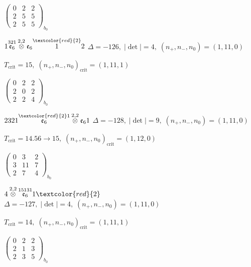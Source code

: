 \documentclass[10pt]{article}
\begin{document}
\hspace{2em}$\left(\begin{smallmatrix}0 & 2 & 2 \\ 2 & 5 & 5 \\ 2 & 5 & 5\end{smallmatrix}\right)_{\!b_0}$

$1\overset{321}{\mathfrak{e}_6}\overset{2,2}{\otimes}\mathfrak{e}_6\overset{\textcolor{red}{2}}{1}2$ \quad $\Delta=-126,\; |\det|=4,\; (n_+,n_-,n_0)=(1,11,0)$

\hspace{1em}$T_{\text{crit}}=15,\; (n_+,n_-,n_0)_{\text{crit}}=(1,11,1)$

\hspace{2em}$\left(\begin{smallmatrix}0 & 2 & 2 \\ 2 & 0 & 2 \\ 2 & 2 & 4\end{smallmatrix}\right)_{\!b_0}$

\smallskip

$2321\overset{\textcolor{red}{2}1}{\mathfrak{e}_6}\overset{2,2}{\otimes}\mathfrak{e}_61$ \quad $\Delta=-128,\; |\det|=9,\; (n_+,n_-,n_0)=(1,11,0)$

\hspace{1em}$T_{\text{crit}}=14.56 \to 15,\; (n_+,n_-,n_0)_{\text{crit}}=(1,12,0)$

\hspace{2em}$\left(\begin{smallmatrix}0 & 3 & 2 \\ 3 & 11 & 7 \\ 2 & 7 & 4\end{smallmatrix}\right)_{\!b_0}$

\smallskip

$4\overset{2,2}{\otimes}\overset{15131}{\mathfrak{e}_6}1\textcolor{red}{2}$ \quad $\Delta=-127,\; |\det|=4,\; (n_+,n_-,n_0)=(1,11,0)$

\hspace{1em}$T_{\text{crit}}=14,\; (n_+,n_-,n_0)_{\text{crit}}=(1,11,1)$

\hspace{2em}$\left(\begin{smallmatrix}0 & 2 & 2 \\ 2 & 1 & 3 \\ 2 & 3 & 5\end{smallmatrix}\right)_{\!b_0}$
\end{document}
